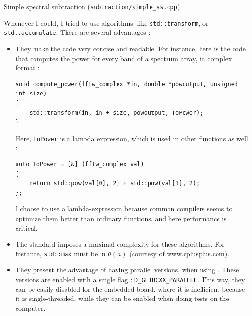 \begin{algorithm}
 \SetAlgoLined

 \caption{Simple spectral subtraction (\texttt{subtraction/simple\_ss.cpp})}
\end{algorithm}

Whenever I could, I tried to use  algorithms, like \texttt{std::transform}, or \texttt{std::accumulate}.
There are several advantages : 
\begin{itemize}
\item They make the code very concise and readable. For instance, here is the code that computes the power for every band of a spectrum array, in complex format : 
\begin{lstlisting}[caption=math\_util.cpp]
void compute_power(fftw_complex *in, double *powoutput, unsigned int size)
{
	std::transform(in, in + size, powoutput, ToPower);
}
\end{lstlisting}

Here, \texttt{ToPower} is a  lambda expression, which is used in other functions as well :
\begin{lstlisting}[caption=math\_util.cpp]
auto ToPower = [&] (fftw_complex val)
{
	return std::pow(val[0], 2) + std::pow(val[1], 2);
};
\end{lstlisting}
I choose to use a lambda-expression because common compilers seems to optimize them better than ordinary functions\cite[p.~213]{cppstl}, and here performance is critical.
\item The  standard imposes a maximal complexity for these algorithms. For instance, \texttt{std::max} must be in $\theta(n)$ (courtesy of \url{www.cplusplus.com}).
\item They present the advantage of having parallel versions, when using . These versions are enabled with a single  flag : \texttt{D\_GLIBCXX\_PARALLEL}. This way, they can be easily disabled for the embedded board, where it is inefficient because it is single-threaded, while they can be enabled when doing tests on the computer. 
\end{itemize}


